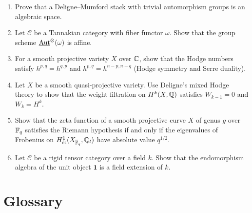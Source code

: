 \begin{enumerate}
    \item [B] Prove that a Deligne--Mumford stack with trivial automorphism groups is an algebraic space.
    \item [I] Let \(\mathcal{C}\) be a Tannakian category with fiber functor \(\omega\). Show that the group scheme \(\underline{\operatorname{Aut}}^\otimes(\omega)\) is affine.
    \item [B] For a smooth projective variety \(X\) over \(\mathbb{C}\), show that the Hodge numbers satisfy \(h^{p,q} = h^{q,p}\) and \(h^{p,q} = h^{n-p,n-q}\) (Hodge symmetry and Serre duality).
    \item [I] Let \(X\) be a smooth quasi-projective variety. Use Deligne's mixed Hodge theory to show that the weight filtration on \(H^k(X, \mathbb{Q})\) satisfies \(W_{k-1} = 0\) and \(W_k = H^k\).
    \item [B] Show that the zeta function of a smooth projective curve \(X\) of genus \(g\) over \(\mathbb{F}_q\) satisfies the Riemann hypothesis if and only if the eigenvalues of Frobenius on \(H^1_{\text{\'et}}(X_{\overline{\mathbb{F}}_q}, \mathbb{Q}_l)\) have absolute value \(q^{1/2}\).
    \item [I] Let \(\mathcal{C}\) be a rigid tensor category over a field \(k\). Show that the endomorphism algebra of the unit object \(\mathbf{1}\) is a field extension of \(k\).
\end{enumerate}

\section*{Glossary}

